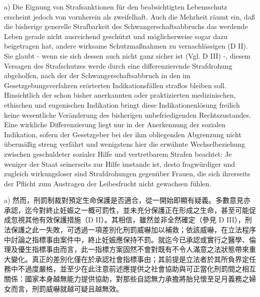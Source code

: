 \documentclass[12pt]{article}
\begin{document}
\syncleft
\begin{sourcepara}
a) Die Eignung von Strafsanktionen für den beabsichtigten Lebensschutz erscheint jedoch von vornherein als zweifelhaft. Auch die Mehrheit räumt ein, daß die bisherige generelle Strafbarkeit des Schwangerschaftsabbruchs das werdende Leben gerade nicht ausreichend geschützt und möglicherweise sogar dazu beigetragen hat, andere wirksame Schutzmaßnahmen zu vernachlässigen (D II). Sie glaubt - wenn sie sich dessen auch nicht ganz sicher ist (Vgl. D III) -, diesem Versagen des Strafschutzes werde durch eine differenzierende Strafdrohung abgeholfen, nach der der Schwangerschaftsabbruch in den im Gesetzgebungsverfahren erörterten Indikationsfällen straflos bleiben soll. Hinsichtlich der schon bisher anerkannten oder praktizierten medizinischen, ethischen und eugenischen Indikation bringt diese Indikationenlösung freilich keine wesentliche Veränderung des bisherigen unbefriedigenden Rechtszustandes. Eine wirkliche Differenzierung liegt nur in der Anerkennung der sozialen Indikation, sofern der Gesetzgeber bei der ihm obliegenden Abgrenzung nicht übermäßig streng verfährt und wenigstens hier die erwähnte Wechselbeziehung zwischen geschuldeter sozialer Hilfe und vertretbarem Strafen beachtet: Je weniger der Staat seinerseits zur Hilfe imstande ist, desto fragwürdiger und zugleich wirkungsloser sind Strafdrohungen gegenüber Frauen, die sich ihrerseits der Pflicht zum Austragen der Leibesfrucht nicht gewachsen fühlen.
\end{sourcepara}
\begin{transpara}
a) 然而，刑罰制裁對預定生命保護是否適合，從一開始即顯有疑義。多數意見亦承認，迄今對終止妊娠之一概可罰性，並未充分保護正在形成之生命，甚至可能促成忽視其他有效保護措施（D II）。其相信，雖然並非全然確定（參見 D III），刑法保護之此一失敗，可透過一項差別化刑罰威嚇加以補救；依該威嚇，在立法程序中討論之指標事由案件中，終止妊娠應保持不罰。就迄今已承認或實行之醫學、倫理及優生指標事由而言，此一指標方案固然不會對既有不令人滿意之法狀態帶來重大變化。真正的差別化僅在於承認社會指標事由；其前提是立法者於其所負界定任務中不過度嚴格，並至少在此注意前述應提供之社會協助與可正當化刑罰間之相互關係：國家本身越無能力提供協助，對那些自認無力承擔將胎兒懷至足月義務之婦女而言，刑罰威嚇就越可疑且越無效。
\end{transpara}
\end{document}
